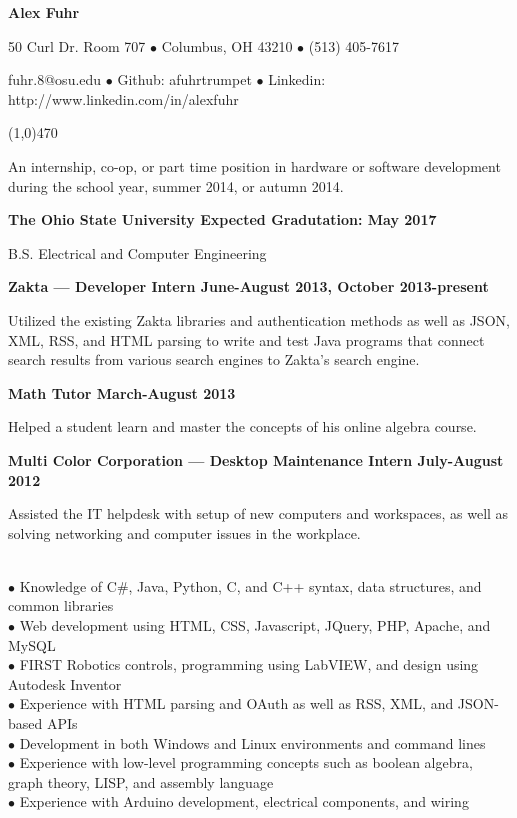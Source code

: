 \documentclass[10pt]{article}
\begin{document}
\centerline{{\LARGE \bf Alex Fuhr}}

\centerline{50 Curl Dr. Room 707 $\bullet$ Columbus, OH 43210 $\bullet$ (513) 405-7617}
\centerline{fuhr.8@osu.edu $\bullet$ Github: afuhrtrumpet $\bullet$ Linkedin: http://www.linkedin.com/in/alexfuhr}
\noindent
\line(1,0){470}\\

\smallskip

\noindent
An internship, co-op, or part time position in hardware or software development during the school year, summer 2014, or autumn 2014.
\medskip

\smallskip

\centerline{{\large \bf The Ohio State University \hfill Expected Gradutation: May 2017}}
\noindent
B.S. Electrical and Computer Engineering
\medskip

\smallskip

\centerline{{\large \bf Zakta --- Developer Intern \hfill June-August 2013, October 2013-present}}
\noindent
Utilized the existing Zakta libraries and authentication methods as well as JSON, XML, RSS, and HTML parsing to write and test Java programs that connect search results from various search engines to Zakta's search engine.

\centerline{{\large \bf Math Tutor \hfill March-August 2013}}
\noindent
Helped a student learn and master the concepts of his online algebra course.

\centerline{{\large \bf Multi Color Corporation --- Desktop Maintenance Intern \hfill July-August 2012}}
\noindent
Assisted the IT helpdesk with setup of new computers and workspaces, as well as solving networking and computer issues in the workplace.
\medskip

\\
\smallskip
$\bullet$ Knowledge of C\#, Java, Python, C, and C++ syntax, data structures, and common libraries\\
$\bullet$ Web development using HTML, CSS, Javascript, JQuery, PHP, Apache, and MySQL\\
$\bullet$ FIRST Robotics controls, programming using LabVIEW, and design using Autodesk Inventor\\
$\bullet$ Experience with HTML parsing and OAuth as well as RSS, XML, and JSON-based APIs\\
$\bullet$ Development in both Windows and Linux environments and command lines\\
$\bullet$ Experience with low-level programming concepts such as boolean algebra, graph theory, LISP, and assembly language\\
$\bullet$ Experience with Arduino development, electrical components, and wiring
\medskip
\end{document}
